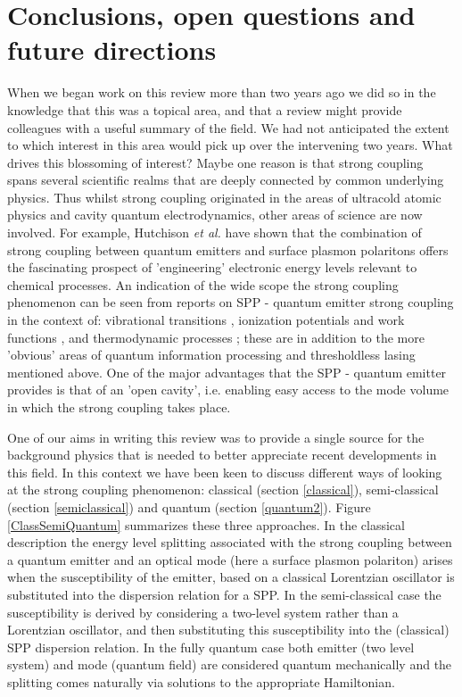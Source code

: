 \documentclass[12pt]{iopart}
\begin{document}
 
\section{Conclusions, open questions and future directions} \label{conclusions}

When we began work on this review more than two years ago we did so in the knowledge that this was a topical area, and that a review might provide colleagues with a useful summary of the field. We had not anticipated the extent to which interest in this area would pick up over the intervening two years. What drives this blossoming of interest? Maybe one reason is that strong coupling spans several scientific realms that are deeply connected by common underlying physics. Thus whilst strong coupling originated in the areas of ultracold atomic physics and cavity quantum electrodynamics, other areas of science are now involved. For example, Hutchison {\it et al.}  \cite{Hutchison2012} have shown that the combination of strong coupling between quantum emitters and surface plasmon polaritons offers the fascinating prospect of 'engineering' electronic energy levels relevant to chemical processes. An indication of the wide scope the strong coupling phenomenon can be seen from reports on SPP - quantum emitter strong coupling in the context of: vibrational transitions \cite{Nagasawa_JPCL_2014_5_14}, ionization potentials and work functions \cite{Hutchison_AdvMat_2013_25_2481}, and thermodynamic processes \cite{Canaguier-Durand_AngChemIntEd_2013_52_10533}; these are in addition to the more 'obvious' areas of quantum information processing and thresholdless lasing mentioned above. One of the major advantages that the SPP - quantum emitter provides is that of an 'open cavity', i.e. enabling easy access to the mode volume in which the strong coupling takes place.

One of our aims in writing this review was to provide a single source for the background physics that is needed to better appreciate recent developments in this field. In this context we have been keen to discuss different ways of looking at the strong coupling phenomenon: classical (section \ref{classical}), semi-classical (section \ref{semiclassical}) and quantum (section \ref{quantum2}). Figure \ref{ClassSemiQuantum} summarizes these three approaches. In the classical description the energy level splitting associated with the strong coupling between a quantum emitter and an optical mode (here a surface plasmon polariton) arises when the susceptibility of the emitter, based on a classical Lorentzian oscillator is substituted into the dispersion relation for a SPP. In the semi-classical case the susceptibility is derived by considering a two-level system rather than a Lorentzian oscillator, and then substituting this susceptibility into the (classical) SPP dispersion relation. In the fully quantum case both emitter (two level system) and mode (quantum field) are considered quantum mechanically and the splitting comes naturally via solutions to the appropriate Hamiltonian.
\end{document}
